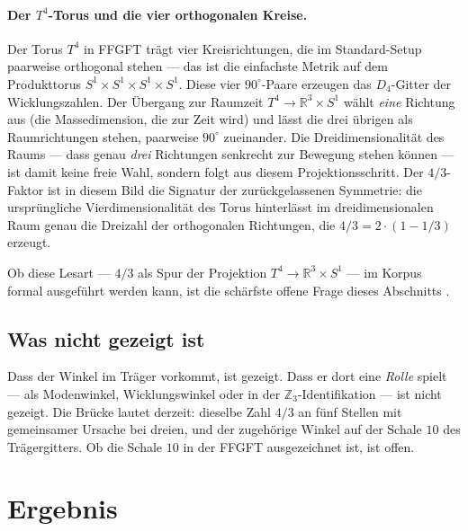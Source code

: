 \paragraph{Der $T^4$-Torus und die vier orthogonalen Kreise.}
Der Torus $T^4$ in FFGFT trägt vier Kreisrichtungen, die im Standard-Setup
paarweise orthogonal stehen --- das ist die einfachste Metrik auf dem Produkttorus
$S^1\times S^1\times S^1\times S^1$. Diese vier $90^\circ$-Paare erzeugen das
$D_4$-Gitter der Wicklungszahlen. Der Übergang zur Raumzeit $T^4 \to
\mathbb R^3\times S^1$ wählt \emph{eine} Richtung aus (die Massedimension, die
zur Zeit wird) und lässt die drei übrigen als Raumrichtungen stehen, paarweise
$90^\circ$ zueinander. Die Dreidimensionalität des Raums --- dass genau
\emph{drei} Richtungen senkrecht zur Bewegung stehen können --- ist damit keine
freie Wahl, sondern folgt aus diesem Projektionsschritt. Der $4/3$-Faktor ist
in diesem Bild die Signatur der zurückgelassenen Symmetrie: die ursprüngliche
Vierdimensionalität des Torus hinterlässt im dreidimensionalen Raum genau die
Dreizahl der orthogonalen Richtungen, die $4/3 = 2\cdot(1-1/3)$ erzeugt.

Ob diese Lesart --- $4/3$ als Spur der Projektion $T^4\to\mathbb R^3\times S^1$
--- im Korpus formal ausgeführt werden kann, ist die schärfste offene Frage
dieses Abschnitts \SM.

\subsection{Was nicht gezeigt ist \SM}

Dass der Winkel im Träger vorkommt, ist gezeigt. Dass er dort eine
\emph{Rolle} spielt --- als Modenwinkel, Wicklungswinkel oder in der
$\mathbb Z_3$-Identifikation --- ist nicht gezeigt. Die Brücke lautet
derzeit: dieselbe Zahl $4/3$ an fünf Stellen mit gemeinsamer Ursache bei
dreien, und der zugehörige Winkel auf der Schale $10$ des Trägergitters. Ob
die Schale $10$ in der FFGFT ausgezeichnet ist, ist offen.

\section{Ergebnis}

